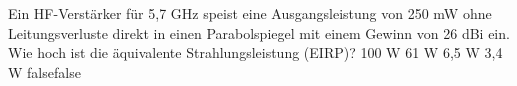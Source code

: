     {Ein HF-Verstärker für 5,7 GHz speist eine Ausgangsleistung von 250 mW ohne Leitungsverluste direkt in einen Parabolspiegel mit einem Gewinn von 26 dBi ein. Wie hoch ist die äquivalente Strahlungsleistung (EIRP)?}
    {100 W}
    {61 W}
    {6,5 W}
    {3,4 W}
    {false}{false}
